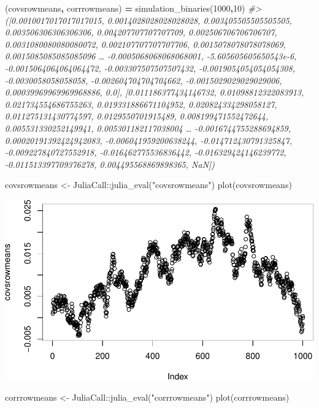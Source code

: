 \documentclass[
]{article}
\newenvironment{Shaded}{\begin{snugshade}}{\end{snugshade}}
\newcommand{\CommentTok}[1]{\textcolor[rgb]{0.56,0.35,0.01}{\textit{#1}}}
\newcommand{\FloatTok}[1]{\textcolor[rgb]{0.00,0.00,0.81}{#1}}
\newcommand{\FunctionTok}[1]{\textcolor[rgb]{0.00,0.00,0.00}{#1}}
\newcommand{\NormalTok}[1]{#1}
\newcommand{\OperatorTok}[1]{\textcolor[rgb]{0.81,0.36,0.00}{\textbf{#1}}}
\newcommand{\OtherTok}[1]{\textcolor[rgb]{0.56,0.35,0.01}{#1}}
\newcommand{\SpecialCharTok}[1]{\textcolor[rgb]{0.00,0.00,0.00}{#1}}
\newcommand{\StringTok}[1]{\textcolor[rgb]{0.31,0.60,0.02}{#1}}
\begin{document}
\begin{Shaded}
\begin{Highlighting}[]
\NormalTok{(covsrowmeans}\OperatorTok{,}\NormalTok{ corrrowmeans) }\OperatorTok{=}\NormalTok{ simulation\_binaries(}\FloatTok{1000}\OperatorTok{,}\FloatTok{10}\NormalTok{)}
\CommentTok{\#\textgreater{} ([0.0010017017017017015, 0.0014028028028028028, 0.003405505505505505, 0.003506306306306306, 0.004207707707707709, 0.002506706706706707, 0.0031080080080080072, 0.002107707707707706, 0.0015078078078078069, 0.0015085085085085096  …  {-}0.0005068068068068001, {-}5.605605605650543e{-}6, {-}0.0015064064064064472, {-}0.003307507507507432, {-}0.0019054054054054308, {-}0.0030058058058058, {-}0.002604704704704662, {-}0.0015029029029029006, 0.00039969969969968886, 0.0], [0.011186377434146732, 0.01098812322083913, 0.021734554686755263, 0.019331886671104952, 0.020824334298058127, 0.011275131430774597, 0.0129550701915489, 0.008199471552472644, 0.005531330252149941, 0.005301182117038004  …  {-}0.0016744755288694859, 0.00020191392424942083, {-}0.006041959200638244, {-}0.014712430791325847, {-}0.009227840727552918, {-}0.016462775536836442, {-}0.016329424146239772, {-}0.011513397709376278, 0.004495568869898365, NaN])}
\end{Highlighting}
\end{Shaded}

\begin{Shaded}
\begin{Highlighting}[]
\NormalTok{covsrowmeans }\OtherTok{\textless{}{-}}\NormalTok{ JuliaCall}\SpecialCharTok{::}\FunctionTok{julia\_eval}\NormalTok{(}\StringTok{"covsrowmeans"}\NormalTok{)}
\FunctionTok{plot}\NormalTok{(covsrowmeans)}
\end{Highlighting}
\end{Shaded}

\includegraphics{./figures/unnamed-chunk-10-1.pdf}

\begin{Shaded}
\begin{Highlighting}[]
\NormalTok{corrrowmeans }\OtherTok{\textless{}{-}}\NormalTok{ JuliaCall}\SpecialCharTok{::}\FunctionTok{julia\_eval}\NormalTok{(}\StringTok{"corrrowmeans"}\NormalTok{)}
\FunctionTok{plot}\NormalTok{(corrrowmeans)}
\end{Highlighting}
\end{Shaded}
\end{document}
